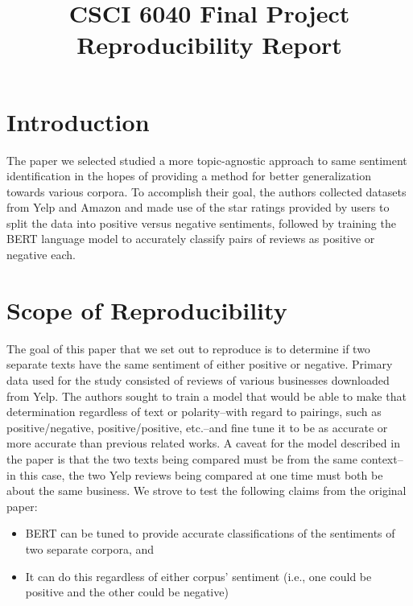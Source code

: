 \documentclass[conference]{IEEEtran}
\begin{document}
\title{CSCI 6040 Final Project\\Reproducibility Report}

\author{
\and
{}
\and
{}
}

\maketitle

\section{Introduction}
	The paper we selected studied a more topic-agnostic approach to same sentiment identification in the hopes of providing a method for better generalization towards various corpora. To accomplish their goal, the authors collected datasets from Yelp and Amazon and made use of the star ratings provided by users to split the data into positive versus negative sentiments, followed by training the BERT language model to accurately classify pairs of reviews as positive or negative each.
	
\section{Scope of Reproducibility}
	The goal of this paper that we set out to reproduce is to determine if two separate texts have the same sentiment of either positive or negative. Primary data used for the study consisted of reviews of various businesses downloaded from Yelp. The authors sought to train a model that would be able to make that determination regardless of text or polarity–with regard to pairings, such as positive/negative, positive/positive, etc.–and fine tune it to be as accurate or more accurate than previous related works. A caveat for the model described in the paper is that the two texts being compared must be from the same context–in this case, the two Yelp reviews being compared at one time must both be about the same business.
	We strove to test the following claims from the original paper:
\begin{itemize}
	\item{BERT can be tuned to provide accurate classifications of the sentiments of two separate corpora, and}
	\item{It can do this regardless of either corpus’ sentiment (i.e., one could be positive and the other could be negative)}
\end{itemize}
\end{document}
